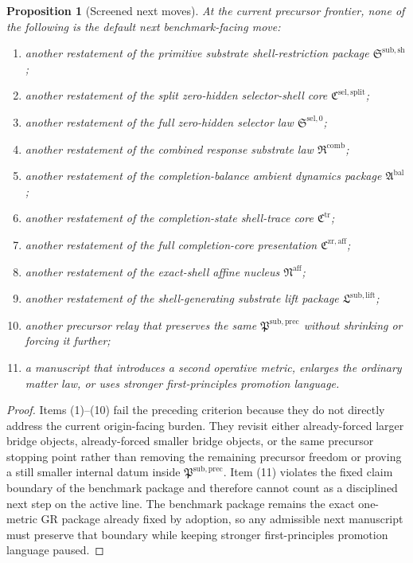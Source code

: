 \documentclass[11pt]{article}
\newcommand{\CompletionCore}{\mathfrak C^{\mathrm{zr,aff}}}
\newcommand{\TraceCore}{\mathfrak C^{\mathrm{tr}}}
\newcommand{\AffineNucleus}{\mathfrak N^{\mathrm{aff}}}
\newcommand{\AmbientPackage}{\mathfrak A^{\mathrm{bal}}}
\newcommand{\CombinedLaw}{\mathfrak R^{\mathrm{comb}}}
\newcommand{\SelectorLaw}{\mathfrak S^{\mathrm{sel},0}}
\newcommand{\SelectorCore}{\mathfrak C^{\mathrm{sel,split}}}
\newcommand{\ShellRestriction}{\mathfrak S^{\mathrm{sub,sh}}}
\newcommand{\LiftPackage}{\mathfrak L^{\mathrm{sub,lift}}}
\newcommand{\PrecursorPackage}{\mathfrak P^{\mathrm{sub,prec}}}
\newtheorem{proposition}{Proposition}
\begin{document}
\begin{proposition}[Screened next moves]
At the current precursor frontier, none of the following is the default next benchmark-facing move:
\begin{enumerate}
    \item another restatement of the primitive substrate shell-restriction package \(\ShellRestriction\);
    \item another restatement of the split zero-hidden selector-shell core \(\SelectorCore\);
    \item another restatement of the full zero-hidden selector law \(\SelectorLaw\);
    \item another restatement of the combined response substrate law \(\CombinedLaw\);
    \item another restatement of the completion-balance ambient dynamics package \(\AmbientPackage\);
    \item another restatement of the completion-state shell-trace core \(\TraceCore\);
    \item another restatement of the full completion-core presentation \(\CompletionCore\);
    \item another restatement of the exact-shell affine nucleus \(\AffineNucleus\);
    \item another restatement of the shell-generating substrate lift package \(\LiftPackage\);
    \item another precursor relay that preserves the same \(\PrecursorPackage\) without shrinking or forcing it further;
    \item a manuscript that introduces a second operative metric, enlarges the ordinary matter law, or uses stronger first-principles promotion language.
\end{enumerate}
\end{proposition}

\begin{proof}
Items (1)--(10) fail the preceding criterion because they do not directly address the current origin-facing burden. They revisit either already-forced larger bridge objects, already-forced smaller bridge objects, or the same precursor stopping point rather than removing the remaining precursor freedom or proving a still smaller internal datum inside \(\PrecursorPackage\). Item (11) violates the fixed claim boundary of the benchmark package and therefore cannot count as a disciplined next step on the active line. The benchmark package remains the exact one-metric GR package already fixed by adoption, so any admissible next manuscript must preserve that boundary while keeping stronger first-principles promotion language paused.
\end{proof}
\end{document}
